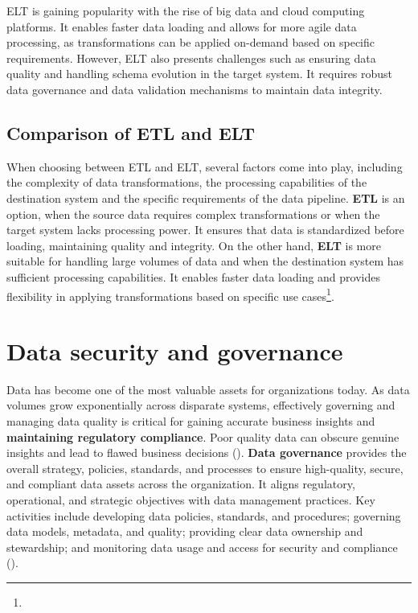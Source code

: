 ELT is gaining popularity with the rise of big data and cloud computing platforms. It enables faster data loading and allows for more agile data processing, as transformations can be applied on-demand based on specific requirements. However, ELT also presents challenges such as ensuring data quality and handling schema evolution in the target system. It requires robust data governance and data validation mechanisms to maintain data integrity\footnotemark[17].

\subsection{Comparison of ETL and ELT}
When choosing between ETL and ELT, several factors come into play, including the complexity of data transformations, the processing capabilities of the destination system and the specific requirements of the data pipeline. \textbf{ETL} is an option, when the source data requires complex transformations or when the target system lacks processing power. It ensures that data is standardized before loading, maintaining quality and integrity. On the other hand, \textbf{ELT} is more suitable for handling large volumes of data and when the destination system has sufficient processing capabilities. It enables faster data loading and provides flexibility in applying transformations based on specific use cases\footnote[17]{}.

\section{Data security and governance}
Data has become one of the most valuable assets for organizations today. As data volumes grow exponentially across disparate systems, effectively governing and managing data quality is critical for gaining accurate business insights and \textbf{maintaining regulatory compliance}. Poor quality data can obscure genuine insights and lead to flawed business decisions (\cite{Achanta2023DataGA})\footnotemark[23]. \textbf{Data governance} provides the overall strategy, policies, standards, and processes to ensure high-quality, secure, and compliant data assets across the organization. It aligns regulatory, operational, and strategic objectives with data management practices. Key activities include developing data policies, standards, and procedures; governing data models, metadata, and quality; providing clear data ownership and stewardship; and monitoring data usage and access for security and compliance (\cite{Achanta2023DataGA}).

